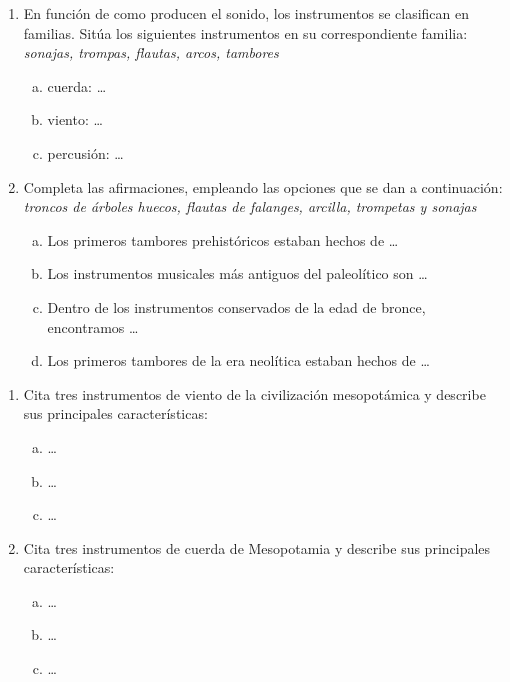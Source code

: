 \documentclass[letterpaper,12pt,notitlepage,spanish]{article}
\begin{document}
\begin{ejercicio}
	\begin{enumerate}[1.-]
%
%
		\item 
		En función de como producen el sonido, los instrumentos se clasifican en familias. Sitúa los siguientes instrumentos en su correspondiente familia: 
	\textit{sonajas, trompas, flautas, arcos, tambores}
%
		\begin{enumerate}[a)]
		\item cuerda: \ldots
		\item viento: \ldots
		\item percusión: \ldots
		\end{enumerate}
%
%
		\item Completa las afirmaciones, empleando las opciones que se dan a continuación: \\
		 \textit{troncos de árboles huecos, flautas de falanges, arcilla, trompetas y sonajas}
		\begin{enumerate}[a)]
		\item Los primeros tambores prehistóricos estaban hechos de \ldots
		\item Los instrumentos musicales más antiguos del paleolítico son \ldots
		\item Dentro de los instrumentos conservados de la edad de bronce, encontramos \ldots 
		\item Los primeros tambores de la era neolítica estaban hechos de \ldots
		\end{enumerate}
%
	\end{enumerate}
\end{ejercicio}
%
% 
\begin{ejercicio}
	\begin{enumerate}[1.-]
%
		\item Cita tres instrumentos de viento de la civilización mesopotámica y describe sus principales características:
		\begin{enumerate}[a)]
		\item \ldots
		\vspace{1.5cm}
		\item \ldots
		\vspace{1.5cm}
		\item \ldots
		\vspace{1.5cm}
		\end{enumerate}
%
		\item Cita tres instrumentos de cuerda de Mesopotamia y describe sus principales características:
		\begin{enumerate}[a)]
		\item \ldots
		\vspace{1.5cm}
		\item \ldots
		\vspace{1.5cm}
		\item \ldots
		\vspace{1.5cm}
		\end{enumerate} 
	\end{enumerate}
\end{ejercicio}
\end{document}
